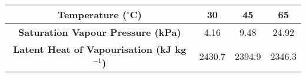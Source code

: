 \begin{center}
\renewcommand{\arraystretch}{1.5}
\begin{tabular}{|c|c|c|c|}
\hline
\textbf{Temperature ($^\circ$C)} & 30 & 45 & 65 \\ \hline
\textbf{Saturation Vapour Pressure (kPa)} & 4.16 & 9.48 & 24.92 \\ \hline
\textbf{Latent Heat of Vapourisation (kJ kg$^{-1}$)} & 2430.7 & 2394.9 & 2346.3 \\ \hline
\end{tabular}
\end{center}